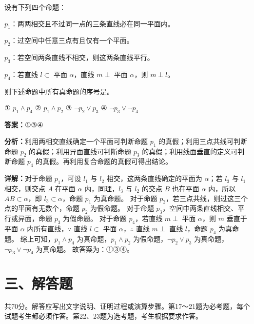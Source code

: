 \begin{question}[points=5]
设有下列四个命题：

$p_1$：两两相交且不过同一点的三条直线必在同一平面内。

$p_2$：过空间中任意三点有且仅有一个平面。

$p_3$：若空间两条直线不相交，则这两条直线平行。

$p_4$：若直线 $l \subset$ 平面 $\alpha$，直线 $m\perp$ 平面 $\alpha$，则 $m\perp l$。

则下述命题中所有真命题的序号是。

① $p_1 \land p_4$ ② $p_1 \land p_2$ ③ $\lnot p_2 \lor p_3$ ④ $\lnot p_3 \lor \lnot p_4$
\fillin[{$①③④$}]
\begin{solution}
\textbf{答案：}$①③④$

\textbf{分析：}利用两相交直线确定一个平面可判断命题 $p_1$ 的真假；利用三点共线可判断命题 $p_2$ 的真假；利用异面直线可判断命题 $p_3$ 的真假；利用线面垂直的定义可判断命题 $p_4$ 的真假。再利用复合命题的真假可得出结论。

\textbf{详解：}对于命题 $p_1$，可设 $l_1$ 与 $l_2$ 相交，这两条直线确定的平面为 $\alpha$；若 $l_3$ 与 $l_1$ 相交，则交点 $A$ 在平面 $\alpha$ 内，同理，$l_3$ 与 $l_2$ 的交点 $B$ 也在平面 $\alpha$ 内，所以 $AB\subset \alpha$，即 $l_3\subset \alpha$，命题 $p_1$ 为真命题。
对于命题 $p_2$，若三点共线，则过这三个点的平面有无数个，命题 $p_2$ 为假命题。
对于命题 $p_3$，空间中两条直线相交、平行或异面，命题 $p_3$ 为假命题。
对于命题 $p_4$，若直线 $m\perp$ 平面 $\alpha$，则 $m$ 垂直于平面 $\alpha$ 内所有直线，$\because$ 直线 $l\subset$ 平面 $\alpha$，$\therefore$ 直线 $m\perp$ 直线 $l$，命题 $p_4$ 为真命题。
综上可知，$p_1\land p_4$ 为真命题，$p_1\land p_2$ 为假命题，$\lnot p_2\lor p_3$ 为真命题，$\lnot p_3\lor \lnot p_4$ 为真命题。
故答案为：①③④。
\end{solution}
\end{question}

\section*{三、解答题}
共70分。解答应写出文字说明、证明过程或演算步骤。第17～21题为必考题，每个试题考生都必须作答。第22、23题为选考题，考生根据要求作答。

